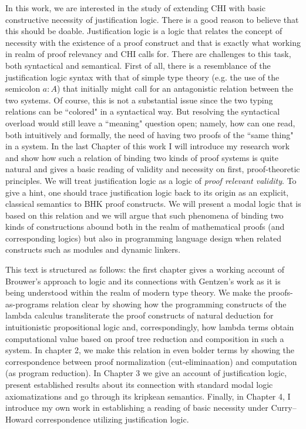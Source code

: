 In this work, we are interested in the study of  extending  \acrfull{CHI} with basic constructive  necessity of justification logic. There is a good reason to believe that this should be doable. Justification logic is a logic that relates the concept of necessity with the existence of a proof construct and that is exactly what working in  realm of proof relevancy and \ac{CHI} calls for. There are challenges to this task, both syntactical and  semantical. First of all, there is a resemblance of the justification logic syntax with that of simple type theory (e.g. the use of the semicolon $a:A$) that  initially might call for an antagonistic relation between the two systems. Of course, this is not a substantial issue since the two typing relations can be ``colored" in a syntactical way. But resolving the syntactical overload would still leave a  ``meaning" question open; namely, how can one read, both intuitively and formally, the need of having two proofs of the ``same thing" in a system. In the last Chapter of this work I will introduce my research work ~\cite{Pouliasis2016} and show how such a relation of binding two kinds of proof systems is quite natural and gives a basic reading of validity and necessity on first, proof-theoretic principles.  We will treat justification logic as a logic of \textit{proof relevant validity}. To give a hint, one should trace justification logic back to its origin as an explicit, classical semantics to \ac{BHK} proof constructs. We will present a modal logic that is based on this relation and we will argue that such phenomena of binding two kinds of constructions abound both in the realm  of mathematical proofs (and corresponding logics) but also in programming language design when related constructs such as modules and dynamic linkers.


This text is structured as follows: the first chapter gives a working account of  Brouwer's approach to logic and its connections with Gentzen's work as it is being understood within the realm of modern type theory. We make the proofs-as-programs relation clear by showing how the programming constructs of the lambda calculus transliterate the proof constructs of natural deduction for intuitionistic propositional logic and, correspondingly,  how lambda terms obtain  computational value based on  proof tree reduction and composition in such a system. In chapter 2, we make this relation in even bolder terms by showing the correspondence between proof normalization (cut-eliminaation) and computation (as program reduction). In Chapter 3 we give an account of justification logic, present established results about its connection with standard modal logic axiomatizations and go through its kripkean semantics. Finally, in Chapter 4, I introduce my own work in establishing a reading of basic necessity under Curry--Howard correspondence utilizing justification logic.

